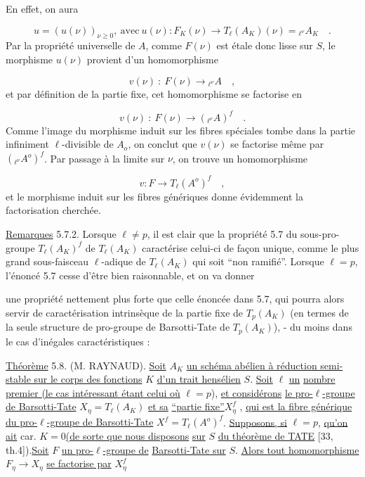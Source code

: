 En effet, on aura

\begin{equation}\tag{5.7.1}
u = (u(\nu))_{\nu \geqslant 0}, \ \mbox{avec} \ u(\nu): F_K(\nu) \longrightarrow T_\ell(A_K)(\nu) = {}_{\ell^\nu}A_K \quad .
\end{equation}
Par la propriété universelle de $A$, comme $F(\nu)$ est étale donc lisse sur $S$, le morphisme $u(\nu)$ provient d'un homomorphisme

\begin{equation*}
v(\nu) \ : \ F(\nu) \longrightarrow {}_{\ell^\nu}A \quad ,
\end{equation*}
et par définition de la partie fixe, cet homomorphisme se factorise en

\begin{equation*}
v(\nu) \ : \ F(\nu) \longrightarrow ({}_{\ell^\nu}A)^f \quad .
\end{equation*}
Comme l'image du morphisme induit sur les fibres spéciales tombe dans la partie infiniment $\ell$-divisible de $A_o$, on conclut que $v(\nu)$ se factorise même par $({}_{\ell^\nu}A^o)^f$. Par passage à la limite sur $\nu$, on trouve un homomorphisme

\begin{equation*}
v: F \longrightarrow T_\ell(A^o)^f \quad ,
\end{equation*}
et le morphisme induit sur les fibres génériques donne évidemment la factorisation cherchée.

\underline{Remarques} 5.7.2. Lorsque $\ell \neq p$, il est clair que la propriété 5.7 du sous-pro-groupe $T_\ell(A_K)^f$ de $T_\ell(A_K)$ caractérise celui-ci de façon unique, comme le plus grand sous-faisceau $\ell$-adique de $T_\ell(A_K)$ qui soit ``non ramifié''. Lorsque $\ell = p$, l'énoncé 5.7 cesse d'être bien raisonnable, et on va donner



une propriété nettement plus forte que celle énoncée dans 5.7, qui pourra alors servir de caractérisation intrinsèque de la partie fixe de $T_p(A_K)$ (en termes de la seule structure de pro-groupe de Barsotti-Tate de $T_p(A_K)$), - du moins dans le cas d'inégales caractéristiques :

\underline{Théorème} 5.8. (M. RAYNAUD). \underline{Soit} $A_K$ \underline{un schéma abélien à réduction semi-stable sur le corps des fonctions} $K$ \underline{d'un trait hensélien} $S$. \underline{Soit} $\ell$ \underline{un} \underline{nombre premier (le cas intéressant étant celui où} $\ell = p$), \underline{et considérons} \underline{le pro-$\ell$-groupe de Barsotti-Tate} $X_\eta = T_\ell(A_K)$ \underline{et sa} \underline{``partie fixe''}$X_\eta^f$ , \underline{qui est la fibre générique du pro-$\ell$-groupe de Barsotti-Tate} $X^f = T_\ell(A^o)^f$. \underline{Supposons, si} $\ell = p$, \underline{qu'on ait} car. $K = 0$\underline{(de sorte que nous disposons} \underline{sur} $S$ \underline{du théorème de TATE} [33, th.4]).\underline{Soit} $F$ \underline{un pro-$\ell$-groupe de} \underline{Barsotti-Tate sur} $S$. \underline{Alors tout homomorphisme} $F_\eta \longrightarrow X_\eta$ \underline{se factorise par} $X_\eta^f$

